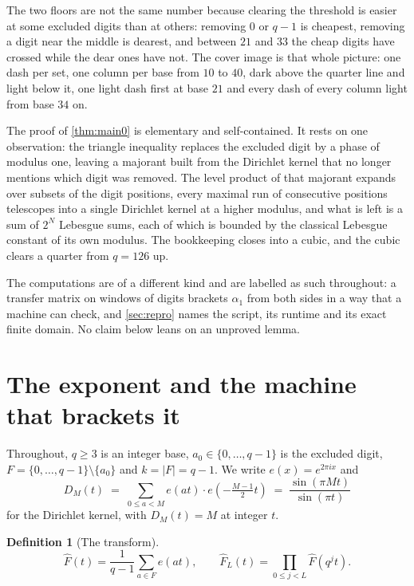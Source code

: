 \documentclass[11pt]{amsart}
\theoremstyle{definition}
\newtheorem{definition}[theorem]{Definition}
\theoremstyle{remark}
\begin{document}
The two floors are not the same number because clearing the threshold is easier at some excluded digits than at others: removing $0$ or $q-1$ is cheapest, removing a digit near the middle is dearest, and between $21$ and $33$ the cheap digits have crossed while the dear ones have not. The cover image is that whole picture: one dash per set, one column per base from $10$ to $40$, dark above the quarter line and light below it, one light dash first at base $21$ and every dash of every column light from base $34$ on.

The proof of \cref{thm:main0} is elementary and self-contained. It rests on one observation: the triangle inequality replaces the excluded digit by a phase of modulus one, leaving a majorant built from the Dirichlet kernel that no longer mentions which digit was removed. The level product of that majorant expands over subsets of the digit positions, every maximal run of consecutive positions telescopes into a single Dirichlet kernel at a higher modulus, and what is left is a sum of $2^{N}$ Lebesgue sums, each of which is bounded by the classical Lebesgue constant of its own modulus. The bookkeeping closes into a cubic, and the cubic clears a quarter from $q = 126$ up.

The computations are of a different kind and are labelled as such throughout: a transfer matrix on windows of digits brackets $\alpha_{1}$ from both sides in a way that a machine can check, and \cref{sec:repro} names the script, its runtime and its exact finite domain. No claim below leans on an unproved lemma.

\section{The exponent and the machine that brackets it}
\label{sec:defs}

Throughout, $q \ge 3$ is an integer base, $a_{0} \in \{0, \dots, q-1\}$ is the excluded digit, $F = \{0,\dots,q-1\}\setminus\{a_{0}\}$ and $k = |F| = q-1$. We write $e(x) = e^{2\pi i x}$ and
\[
  D_{M}(t) \;=\; \sum_{0 \le a < M} e(a t) \cdot e\!\left(-\tfrac{M-1}{2}t\right) \;=\; \frac{\sin(\pi M t)}{\sin(\pi t)}
\]
for the Dirichlet kernel, with $D_{M}(t) = M$ at integer $t$.

\begin{definition}[The transform]
\label{def:hat}
\[
  \widehat{F}(t) = \frac{1}{q-1}\sum_{a \in F} e(a t), \qquad \widehat{F}_{L}(t) = \prod_{0 \le j < L}\widehat{F}(q^{j}t).
\]
\end{definition}
\end{document}
